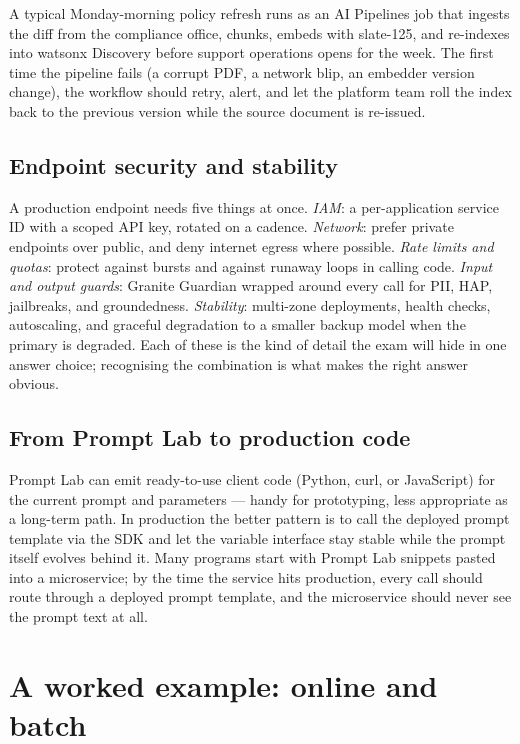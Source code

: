 A typical Monday-morning policy refresh runs as an AI Pipelines job that ingests the diff from the compliance office, chunks, embeds with slate-125, and re-indexes into watsonx Discovery before support operations opens for the week. The first time the pipeline fails (a corrupt PDF, a network blip, an embedder version change), the workflow should retry, alert, and let the platform team roll the index back to the previous version while the source document is re-issued.

\subsection{Endpoint security and stability}

A production endpoint needs five things at once. \emph{IAM}: a per-application service ID with a scoped API key, rotated on a cadence. \emph{Network}: prefer private endpoints over public, and deny internet egress where possible. \emph{Rate limits and quotas}: protect against bursts and against runaway loops in calling code. \emph{Input and output guards}: Granite Guardian wrapped around every call for PII, HAP, jailbreaks, and groundedness. \emph{Stability}: multi-zone deployments, health checks, autoscaling, and graceful degradation to a smaller backup model when the primary is degraded. Each of these is the kind of detail the exam will hide in one answer choice; recognising the combination is what makes the right answer obvious.

\subsection{From Prompt Lab to production code}

Prompt Lab can emit ready-to-use client code (Python, curl, or JavaScript) for the current prompt and parameters --- handy for prototyping, less appropriate as a long-term path. In production the better pattern is to call the deployed prompt template via the SDK and let the variable interface stay stable while the prompt itself evolves behind it. Many programs start with Prompt Lab snippets pasted into a microservice; by the time the service hits production, every call should route through a deployed prompt template, and the microservice should never see the prompt text at all.

\section{A worked example: online and batch}

